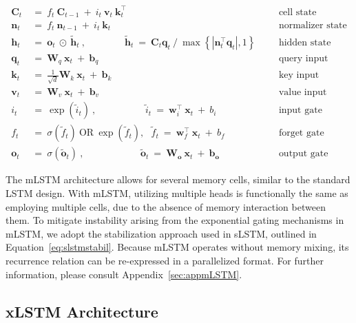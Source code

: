 \begin{align}
\label{eq:mlstm_recurrent_begin}
\mathbf{C}_t \ &= \  f_t \ \mathbf{C}_{t-1} \ + \ 
  i_t \ \mathbf{v}_t \ \mathbf{k}_t^\top & &  &\text{cell state} \\
\mathbf{n}_t \ &= \  f_t \ \mathbf{n}_{t-1} \ + \ 
  i_t \ \mathbf{k}_t & &  &\text{normalizer state} \\
\mathbf{h}_t  \ &= \ \mathbf{o}_t \ \odot \ \tilde{\mathbf{h}}_t
\ , \qquad \qquad 
\tilde{\mathbf{h}}_t \ = \   \mathbf{C}_t \mathbf{q}_t \ / \ 
  \max \left\{ |\mathbf{n}_t^\top \mathbf{q}_t|, 1 \right\} 
   &&&\text{hidden state} \\
\mathbf{q}_t \ &= \ \mathbf{W}_q \ \mathbf{x}_t \ + \ \mathbf{b}_q  & &  &\text{query input} \\
\mathbf{k}_t \ &= \ \frac{1}{\sqrt{d}} \mathbf{W}_k \ \mathbf{x}_t \ + \ \mathbf{b}_k  & &  &\text{key input} \\
\mathbf{v}_t \ &= \ \mathbf{W}_v \ \mathbf{x}_t \ + \ \mathbf{b}_v  & &  &\text{value input} \\
i_t \ &= \ \!\exp \!  \! \left( \tilde{i}_t  \right) \ , 
 \qquad \qquad \ \ \ \ \,
  \tilde{i}_t \ = \ \mathbf{w}^\top_{i} \ \mathbf{x}_t \ + \  b_{i} \ \ \ 
  &&&\text{input gate} \\
f_t \ &= \ \sigma \!  \left(  \tilde{f}_t \right) \ \text{OR} \ \!\exp \!  \! \left(  \tilde{f}_t \right) , \ \ \: \!
\tilde{f}_t \ = \ \mathbf{w}^\top_{f} \ \mathbf{x}_t  \ + \
  b_{f}
  &&& \text{forget gate} \\
\label{eq:mlstm_recurrent_end}
\mathbf{o}_t \ &= \ \sigma \left( \tilde{\mathbf{o}}_t \right) \ , \qquad \qquad \quad \ \ \ \,
  \tilde{\mathbf{o}}_t  \ = \ \mathbf{W}_{\mathbf{o}} \ \mathbf{x}_t \ + \
  \mathbf{b}_{\mathbf{o}}
  &&&\text{output gate} 
\end{align}

The mLSTM architecture allows for several memory cells, similar to the standard LSTM design. With mLSTM, utilizing multiple heads is functionally the same as employing multiple cells, due to the absence of memory interaction between them. To mitigate instability arising from the exponential gating mechanisms in mLSTM, we adopt the stabilization approach used in sLSTM, outlined in Equation~\ref{eq:slstmstabil}. 
Because mLSTM operates without memory mixing, its recurrence relation can be re-expressed in a parallelized format. For further information, please consult Appendix~\ref{sec:appmLSTM}.

\subsection{xLSTM Architecture}
\label{sec:xLSTMarch}

